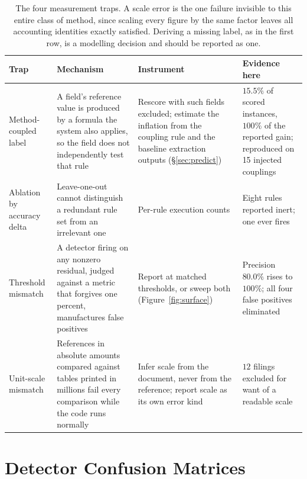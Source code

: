 \documentclass[11pt]{article}
\begin{document}
\begin{table}[t]
\centering\small
\begin{tabular}{@{}p{2.6cm}p{4.4cm}p{3.6cm}p{4.0cm}@{}}
\toprule
\textbf{Trap} & \textbf{Mechanism} & \textbf{Instrument} & \textbf{Evidence here} \\
\midrule
Method-coupled label &
A field's reference value is produced by a formula the system also applies, so the field
does not independently test that rule &
Rescore with such fields excluded; estimate the inflation from the coupling rule and the
baseline extraction outputs (\S\ref{sec:predict}) &
$15.5\%$ of scored instances, $100\%$ of the reported gain; reproduced on 15 injected
couplings \\
\addlinespace[2pt]
Ablation by accuracy delta &
Leave-one-out cannot distinguish a redundant rule set from an irrelevant one &
Per-rule execution counts &
Eight rules reported inert; one ever fires \\
\addlinespace[2pt]
Threshold mismatch &
A detector firing on any nonzero residual, judged against a metric that forgives one
percent, manufactures false positives &
Report at matched thresholds, or sweep both (Figure~\ref{fig:surface}) &
Precision $80.0\%$ rises to $100\%$; all four false positives eliminated \\
\addlinespace[2pt]
Unit-scale mismatch &
References in absolute amounts compared against tables printed in millions fail every
comparison while the code runs normally &
Infer scale from the document, never from the reference; report scale as its own error
kind &
$12$ filings excluded for want of a readable scale \\
\bottomrule
\end{tabular}
\caption{The four measurement traps. A scale error is the one failure invisible to this
entire class of method, since scaling every figure by the same factor leaves all
accounting identities exactly satisfied. Deriving a missing label, as in the first row,
is a modelling decision and should be reported as one.}
\label{tab:traps}
\end{table}

\section{Detector Confusion Matrices}
\label{app:detector}
\end{document}
